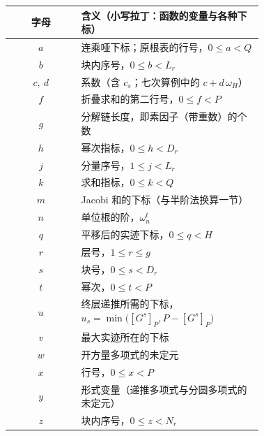 \documentclass[UTF8,a4paper,11pt]{ctexart}
\begin{document}
\begin{center}
\begin{tabular}{c|>{\raggedright\arraybackslash}p{0.72\linewidth}}
\toprule
字母 & 含义（小写拉丁：函数的变量与各种下标） \\
\midrule
$a$ & 连乘哑下标；原根表的行号，$0\le a<Q$ \\
$b$ & 块内序号，$0\le b<L_r$ \\
$c,\ d$ & 系数（含 $c_s$；七次算例中的 $c+d\,\omega_H$） \\
$f$ & 折叠求和的第二行号，$0\le f<P$ \\
$g$ & 分解链长度，即素因子（带重数）的个数 \\
$h$ & 幂次指标，$0\le h<D_r$ \\
$j$ & 分量序号，$1\le j<L_r$ \\
$k$ & 求和指标，$0\le k<Q$ \\
$m$ & Jacobi 和的下标（与半阶法换算一节） \\
$n$ & 单位根的阶，$\omega_n^t$ \\
$q$ & 平移后的实迹下标，$0\le q<H$ \\
$r$ & 层号，$1\le r\le g$ \\
$s$ & 块号，$0\le s<D_r$ \\
$t$ & 幂次，$0\le t<P$ \\
$u$ & 终层递推所需的下标，$u_s=\min\bigl([G^s]_P,P-[G^s]_P\bigr)$ \\
$v$ & 最大实迹所在的下标 \\
$w$ & 开方量多项式的未定元 \\
$x$ & 行号，$0\le x<P$ \\
$y$ & 形式变量（递推多项式与分圆多项式的未定元） \\
$z$ & 块内序号，$0\le z<N_r$ \\
\bottomrule
\end{tabular}
\end{center}
\end{document}
